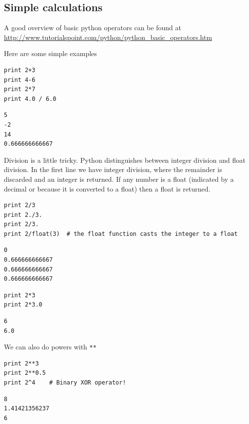 \documentclass[11pt]{article}
\begin{document}
\subsection{Simple calculations}
\label{sec-3-1}

A good overview of basic python operators can be found at \url{http://www.tutorialspoint.com/python/python_basic_operators.htm}

Here are some simple examples
\begin{verbatim}
print 2+3
print 4-6
print 2*7
print 4.0 / 6.0
\end{verbatim}

\begin{verbatim}
5
-2
14
0.666666666667
\end{verbatim}


Division is a little tricky. Python distinguishes between integer division and float division. In the first line we have integer division, where the remainder is discarded and an integer is returned. If any number is a float (indicated by a decimal or because it is converted to a float) then a float is returned.

\begin{verbatim}
print 2/3
print 2./3.
print 2/3.
print 2/float(3)  # the float function casts the integer to a float
\end{verbatim}

\begin{verbatim}
0
0.666666666667
0.666666666667
0.666666666667
\end{verbatim}

\begin{verbatim}
print 2*3
print 2*3.0
\end{verbatim}

\begin{verbatim}
6
6.0
\end{verbatim}

We can also do powers with \texttt{**}

\begin{verbatim}
print 2**3
print 2**0.5
print 2^4    # Binary XOR operator!
\end{verbatim}

\begin{verbatim}
8
1.41421356237
6
\end{verbatim}
\end{document}
